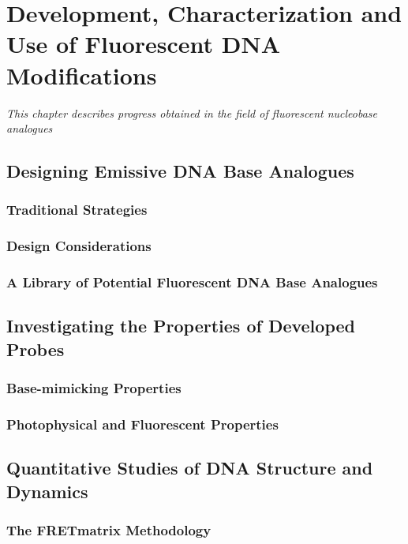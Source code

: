 \chapter{Development, Characterization and Use of Fluorescent DNA Modifications}
\label{chap:Methodologies}
\textit{This chapter describes progress obtained in the field of fluorescent nucleobase analogues}
\vspace{2ex}\vfill
\minitoc
\newpage

\section{Designing Emissive DNA Base Analogues}
\subsection{Traditional Strategies}
\subsection{Design Considerations}
\subsection{A Library of Potential Fluorescent DNA Base Analogues}

\section{Investigating the Properties of Developed Probes}
\subsection{Base-mimicking Properties}
\subsection{Photophysical and Fluorescent Properties}

\section{Quantitative Studies of DNA Structure and Dynamics}
\subsection{The FRETmatrix Methodology}